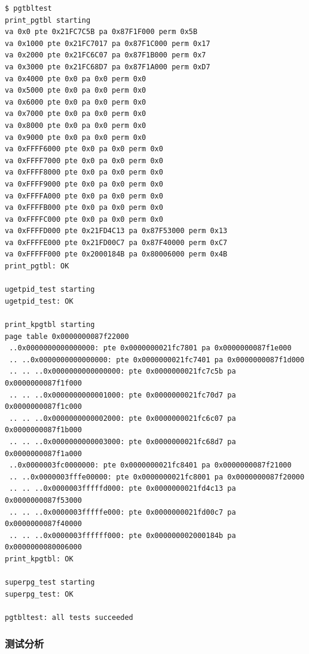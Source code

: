\begin{lstlisting}
$ pgtbltest
print_pgtbl starting
va 0x0 pte 0x21FC7C5B pa 0x87F1F000 perm 0x5B
va 0x1000 pte 0x21FC7017 pa 0x87F1C000 perm 0x17
va 0x2000 pte 0x21FC6C07 pa 0x87F1B000 perm 0x7
va 0x3000 pte 0x21FC68D7 pa 0x87F1A000 perm 0xD7
va 0x4000 pte 0x0 pa 0x0 perm 0x0
va 0x5000 pte 0x0 pa 0x0 perm 0x0
va 0x6000 pte 0x0 pa 0x0 perm 0x0
va 0x7000 pte 0x0 pa 0x0 perm 0x0
va 0x8000 pte 0x0 pa 0x0 perm 0x0
va 0x9000 pte 0x0 pa 0x0 perm 0x0
va 0xFFFF6000 pte 0x0 pa 0x0 perm 0x0
va 0xFFFF7000 pte 0x0 pa 0x0 perm 0x0
va 0xFFFF8000 pte 0x0 pa 0x0 perm 0x0
va 0xFFFF9000 pte 0x0 pa 0x0 perm 0x0
va 0xFFFFA000 pte 0x0 pa 0x0 perm 0x0
va 0xFFFFB000 pte 0x0 pa 0x0 perm 0x0
va 0xFFFFC000 pte 0x0 pa 0x0 perm 0x0
va 0xFFFFD000 pte 0x21FD4C13 pa 0x87F53000 perm 0x13
va 0xFFFFE000 pte 0x21FD00C7 pa 0x87F40000 perm 0xC7
va 0xFFFFF000 pte 0x2000184B pa 0x80006000 perm 0x4B
print_pgtbl: OK

ugetpid_test starting
ugetpid_test: OK

print_kpgtbl starting
page table 0x0000000087f22000
 ..0x0000000000000000: pte 0x0000000021fc7801 pa 0x0000000087f1e000
 .. ..0x0000000000000000: pte 0x0000000021fc7401 pa 0x0000000087f1d000
 .. .. ..0x0000000000000000: pte 0x0000000021fc7c5b pa 0x0000000087f1f000
 .. .. ..0x0000000000001000: pte 0x0000000021fc70d7 pa 0x0000000087f1c000
 .. .. ..0x0000000000002000: pte 0x0000000021fc6c07 pa 0x0000000087f1b000
 .. .. ..0x0000000000003000: pte 0x0000000021fc68d7 pa 0x0000000087f1a000
 ..0x0000003fc0000000: pte 0x0000000021fc8401 pa 0x0000000087f21000
 .. ..0x0000003fffe00000: pte 0x0000000021fc8001 pa 0x0000000087f20000
 .. .. ..0x0000003fffffd000: pte 0x0000000021fd4c13 pa 0x0000000087f53000
 .. .. ..0x0000003fffffe000: pte 0x0000000021fd00c7 pa 0x0000000087f40000
 .. .. ..0x0000003ffffff000: pte 0x000000002000184b pa 0x0000000080006000
print_kpgtbl: OK

superpg_test starting
superpg_test: OK

pgtbltest: all tests succeeded
\end{lstlisting}

\subsubsection{测试分析}

